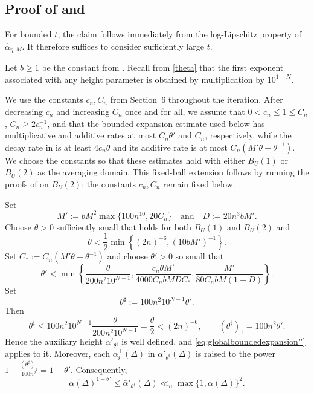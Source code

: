\documentclass[reqno,11pt]{amsart}
\numberwithin{equation}{section}
\theoremstyle{definition}
\theoremstyle{remark}
\begin{document}
\subsection{Proof of  and }
For bounded $t$, the claim follows immediately from the log-Lipschitz
property of $\widehat\alpha_{\eta,M}$. It therefore suffices to consider
sufficiently large $t$.

Let $b\ge1$ be the constant from . Recall from
\eqref{theta} that the first exponent associated with any height parameter is
obtained by multiplication by $10^{1-N}$.

We use the constants $c_n,C_n$ from Section~6 throughout the
iteration. After decreasing $c_n$ and increasing $C_n$ once and for all, we
assume that $0<c_n\le1\le C_n$, $C_n\ge2c_n^{-1}$, and that the
bounded-expansion estimate used below has multiplicative and additive rates
at most $C_n\theta'$ and $C_n$, respectively, while the decay rate in
 is at least $4c_n\theta$ and its additive rate
is at most $C_n(M'\theta+\theta^{-1})$. We choose the constants so that
these estimates hold with either $B_{U}(1)$ or
$B_{U}(2)$ as the averaging domain. This fixed-ball extension follows by
running the proofs of 
on $B_{U}(2)$; the constants $c_n,C_n$ remain fixed below.

Set
$$
M':=bM^2\max\{100n^{10},20C_n\}
\quad\text{and}\quad
D:=20n^3bM'.
$$
Choose $\theta>0$ sufficiently small that  holds
for both $B_{U}(1)$ and $B_{U}(2)$ and
$$
\theta<\frac12\min\left\{(2n)^{-6},(10bM')^{-1}\right\}.
$$
Set
$C_*:=C_n(M'\theta+\theta^{-1})$
and choose $\theta'>0$ so small that
\begin{equation}\label{eq:theta-prime-choice}
\theta'
<
\min\left\{
\frac{\theta}{200n^2 10^{N-1}},
\frac{c_n\theta M'}{4000C_nbMDC_*},
\frac{M'}{80C_nbM(1+D)}
\right\}.
\end{equation}
Set
$$
\theta^{\sharp}:=100n^2 10^{N-1}\theta'.
$$
Then
$$
\theta^{\sharp}
\le
100n^2 10^{N-1}\frac{\theta}{200n^2 10^{N-1}}
=
\frac{\theta}{2}
<
(2n)^{-6},
\qquad
(\theta^{\sharp})_1=100n^2\theta'.
$$
Hence the auxiliary height
$\bar\alpha'_{\theta^{\sharp}}$ is well defined, and
\eqref{eq:globalboundedexpansion''} applies to it. Moreover, each
$\alpha_i^+(\Delta)$ in $\bar\alpha'_{\theta^{\sharp}}(\Delta)$ is raised
to the power $1+\frac{(\theta^{\sharp})_1}{100n^2}
=1+\theta'$. Consequently,
\begin{equation}\label{eq:fixed-auxiliary-height-comparison}
\alpha(\Delta)^{1+\theta'}
\le \bar\alpha'_{\theta^{\sharp}}(\Delta)
\ll_n \max\{1,\alpha(\Delta)\}^{2}.
\end{equation}
\end{document}
